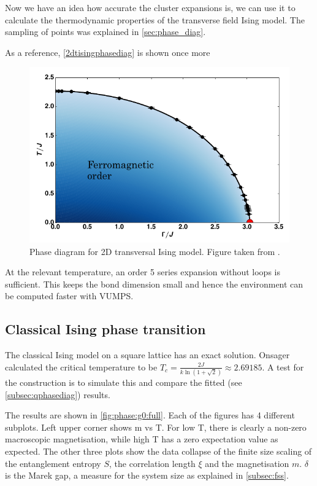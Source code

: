 
Now we have an idea how accurate the cluster expansions is, we can use it to calculate the thermodynamic properties of the transverse field Ising model. The sampling of points was explained in \cref{sec:phase_diag}.

As a reference, \cref{2dtisingphasediag} is shown once more

\begin{figure}[H]
    \center
    \includegraphics[width=\textwidth]{Figuren/phsyics/2disingphase.png}
    \caption{Phase diagram for 2D transversal Ising model. Figure taken from \cite{Hesselmann2016}.}
    \label{2dtisingphasediag2}
\end{figure}

At the relevant temperature, an order 5 series expansion without loops is sufficient. This keeps the bond dimension small and hence the environment can be computed faster with VUMPS.

\subsection{Classical Ising phase transition}
The classical Ising model on a square lattice has an exact solution. Onsager calculated the critical temperature to be $T_c = \frac{2 J}{k \ln(1+\sqrt{2}) } \approx 2.69185$. A test for the construction is to simulate this and compare the fitted (see \cref{subsec:qphasediag}) results.

The results are shown in \cref{fig:phase:g0:full}. Each of the figures has 4 different subplots. Left upper corner shows m vs T. For low T, there is clearly a non-zero macroscopic magnetisation, while high T has a zero expectation value as expected. The other three plots show the data collapse of the finite size scaling of the entanglement entropy $S$, the correlation length $\xi$ and the magnetisation $m$. $\delta$ is the Marek gap, a measure for the system size as explained in \cref{subsec:fss}.

